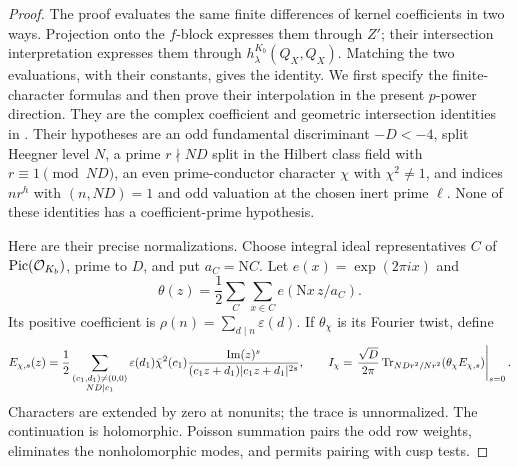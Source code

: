 \begin{proof}
The proof evaluates the same finite differences of kernel
coefficients in two ways.  Projection onto the \(f\)-block
expresses them through \(Z'\); their intersection interpretation
expresses them through \(h_\lambda^{K_b}(Q_X,Q_X)\).  Matching
the two evaluations, with their constants, gives the identity.
We first specify the finite-character formulas and then prove
their interpolation in the present \(p\)-power direction.
They are the complex coefficient and geometric intersection
identities in \cite[Section 6, ``The traced coefficient,''
``Fricke transformation and unfolding,'' and
``Intersection realization'']{B}.
Their hypotheses are an odd fundamental discriminant \(-D<-4\),
split Heegner level \(N\), a prime \(r\nmid ND\) split in the
Hilbert class field with \(r\equiv1\pmod{ND}\), an even
prime-conductor character \(\chi\) with \(\chi^2\ne1\), and
indices \(nr^h\) with \((n,ND)=1\) and odd valuation at the
chosen inert prime \(\ell\).  None of these identities has a
coefficient-prime hypothesis.

Here are their precise normalizations.  Choose integral ideal
representatives \(C\) of \(\operatorname{Pic}(\mathcal O_{K_b})\), prime to
\(D\), and put \(a_C=\mathrm NC\).
Let \(e(x)=\exp(2\pi i x)\) and
\[
 \theta(z)=\frac12\sum_C\sum_{x\in C}e(\mathrm Nx\,z/a_C).
\]
Its positive coefficient is
\(\rho(n)=\sum_{d\mid n}\varepsilon(d)\).  If \(\theta_\chi\)
is its Fourier twist, define
\[
 E_{\chi,s}(z)=\frac12
  \sum_{\substack{(c_1,d_1)\ne(0,0)\\ND\mid c_1}}
    \varepsilon(d_1)\bar\chi^2(c_1)
       \frac{\operatorname{Im}(z)^s}
            {(c_1z+d_1)|c_1z+d_1|^{2s}},
 \qquad
 I_\chi=\left.\frac{\sqrt D}{2\pi}
    \operatorname{Tr}_{NDr^2/Nr^2}(\theta_\chi E_{\chi,s})\right|_{s=0}.
\]
Characters are extended by zero at nonunits; the trace is
unnormalized.  The continuation is holomorphic.  Poisson
summation pairs the odd row weights, eliminates the
nonholomorphic modes, and permits pairing with cusp tests.


\end{proof}

